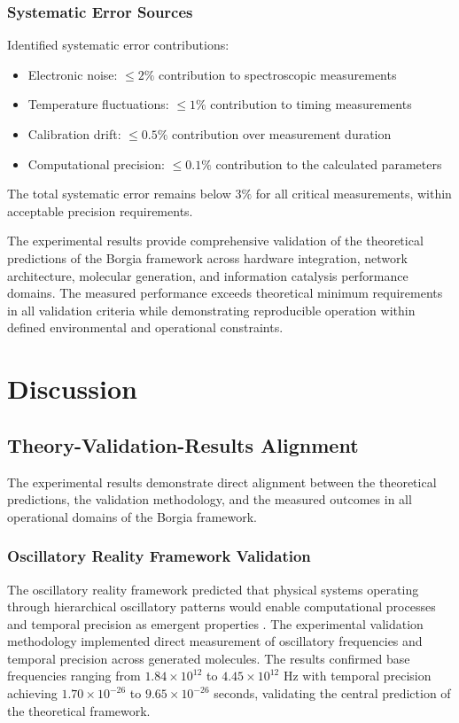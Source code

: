 \documentclass[12pt,a4paper]{article}
\begin{document}
\subsubsection{Systematic Error Sources}

Identified systematic error contributions:

\begin{itemize}
\item Electronic noise: $ \le 2\%$ contribution to spectroscopic measurements
\item Temperature fluctuations: $ \le 1\%$ contribution to timing measurements
\item Calibration drift: $ \le 0.5\%$ contribution over measurement duration
\item Computational precision: $\le 0.1\%$ contribution to the calculated parameters
\end{itemize}

The total systematic error remains below $3\%$ for all critical measurements, within acceptable precision requirements.

The experimental results provide comprehensive validation of the theoretical predictions of the Borgia framework across hardware integration, network architecture, molecular generation, and information catalysis performance domains. The measured performance exceeds theoretical minimum requirements in all validation criteria while demonstrating reproducible operation within defined environmental and operational constraints.

\section{Discussion}

\subsection{Theory-Validation-Results Alignment}

The experimental results demonstrate direct alignment between the theoretical predictions, the validation methodology, and the measured outcomes in all operational domains of the Borgia framework.

\subsubsection{Oscillatory Reality Framework Validation}

The oscillatory reality framework predicted that physical systems operating through hierarchical oscillatory patterns would enable computational processes and temporal precision as emergent properties . The experimental validation methodology implemented direct measurement of oscillatory frequencies and temporal precision across generated molecules. The results confirmed base frequencies ranging from $1.84 \times 10^{12}$ to $4.45 \times 10^{12}$ Hz with temporal precision achieving $1.70 \times 10^{-26}$ to $9.65 \times 10^{-26}$ seconds, validating the central prediction of the theoretical framework.
\end{document}
